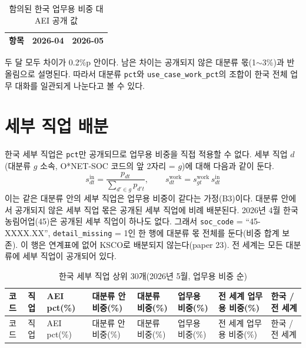 \documentclass[11pt]{article}
\begin{document}
\begin{longtable}{L{9.5cm}R{2.2cm}R{2.2cm}}
\caption{함의된 한국 업무용 비중 대 AEI 공개 값}\label{tab:workpct}\\
\toprule
항목 & 2026-04 & 2026-05 \\
\midrule

\bottomrule
\end{longtable}

두 달 모두 차이가 0.2\%p 안이다. 남은 차이는 공개되지 않은 대분류 몫(1$\sim$3\%)과 반올림으로 설명된다. 따라서 대분류 \texttt{pct}와 \texttt{use\_case\_work\_pct}의 조합이 한국 전체 업무 대화를 일관되게 나눈다고 볼 수 있다.

\section{세부 직업 배분}

한국 세부 직업은 \texttt{pct}만 공개되므로 업무용 비중을 직접 적용할 수 없다. 세부 직업 $d$(대분류 $g$ 소속, O*NET-SOC 코드의 앞 2자리 = $g$)에 대해 다음과 같이 둔다.
\[
s^{\text{in}}_{dt} = \frac{p_{dt}}{\sum_{d' \in g} p_{d't}},\qquad
s^{\text{work}}_{dt} = s^{\text{work}}_{gt}\, s^{\text{in}}_{dt}
\]
이는 같은 대분류 안의 세부 직업은 업무용 비중이 같다는 가정(B3)이다. 대분류 안에서 공개되지 않은 세부 직업 몫은 공개된 세부 직업에 비례 배분된다. 2026년 4월 한국 농림어업(45)은 공개된 세부 직업이 하나도 없다. 그래서 \texttt{soc\_code} = ``45-XXXX.XX'', \texttt{detail\_missing} = 1인 한 행에 대분류 몫 전체를 둔다(비중 합계 보존). 이 행은 연계표에 없어 KSCO로 배분되지 않는다(paper 23). 전 세계는 모든 대분류에 세부 직업이 공개되어 있다.

\begin{longtable}{L{1.7cm}L{4.6cm}R{1.2cm}R{1.4cm}R{1.4cm}R{1.4cm}R{1.5cm}R{1.3cm}}
\caption{한국 세부 직업 상위 30개(2026년 5월, 업무용 비중 순)}\label{tab:detailed}\\
\toprule
코드 & 직업 & AEI pct(\%) & 대분류 안 비중(\%) & 대분류 비중(\%) & 업무용 비중(\%) & 전 세계 업무용 비중(\%) & 한국 / 전 세계 \\
\midrule
\endfirsthead
\toprule
코드 & 직업 & AEI pct(\%) & 대분류 안 비중(\%) & 대분류 비중(\%) & 업무용 비중(\%) & 전 세계 업무용 비중(\%) & 한국 / 전 세계 \\
\midrule
\endhead

\bottomrule
\end{longtable}
\end{document}
